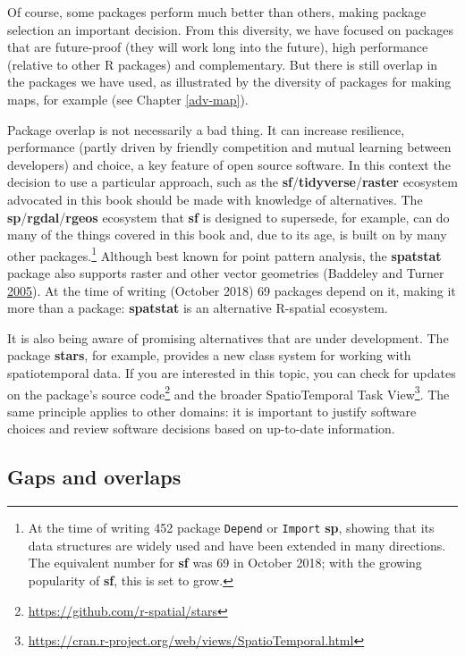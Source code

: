 \documentclass[]{krantz}
\let\rmarkdownfootnote\footnote%
\def\footnote{\protect\rmarkdownfootnote}
\renewcommand{\href}[2]{#2\footnote{\url{#1}}}
\begin{document}
Of course, some packages perform much better than others, making package selection an important decision.
From this diversity, we have focused on packages that are future-proof (they will work long into the future), high performance (relative to other R packages) and complementary.
But there is still overlap in the packages we have used, as illustrated by the diversity of packages for making maps, for example (see Chapter \ref{adv-map}).

Package overlap is not necessarily a bad thing.
It can increase resilience, performance (partly driven by friendly competition and mutual learning between developers) and choice, a key feature of open source software.
In this context the decision to use a particular approach, such as the \textbf{sf}/\textbf{tidyverse}/\textbf{raster} ecosystem advocated in this book should be made with knowledge of alternatives.
The \textbf{sp}/\textbf{rgdal}/\textbf{rgeos} ecosystem that \textbf{sf} is designed to supersede, for example, can do many of the things covered in this book and, due to its age, is built on by many other packages.\footnote{At the time of writing 452 package \texttt{Depend} or \texttt{Import} \textbf{sp}, showing that its data structures are widely used and have been extended in many directions.
  The equivalent number for \textbf{sf} was 69 in October 2018; with the growing popularity of \textbf{sf}, this is set to grow.}
Although best known for point pattern analysis, the \textbf{spatstat} package also supports raster and other vector geometries (Baddeley and Turner \protect\hyperlink{ref-baddeley_spatstat_2005}{2005}).
At the time of writing (October 2018) 69 packages depend on it, making it more than a package: \textbf{spatstat} is an alternative R-spatial ecosystem.

It is also being aware of promising alternatives that are under development.
The package \textbf{stars}, for example, provides a new class system for working with spatiotemporal data.
If you are interested in this topic, you can check for updates on the package's \href{https://github.com/r-spatial/stars}{source code} and the broader \href{https://cran.r-project.org/web/views/SpatioTemporal.html}{SpatioTemporal Task View}.
The same principle applies to other domains: it is important to justify software choices and review software decisions based on up-to-date information.

\hypertarget{gaps}{%
\subsection{Gaps and overlaps}\label{gaps}}
\end{document}
